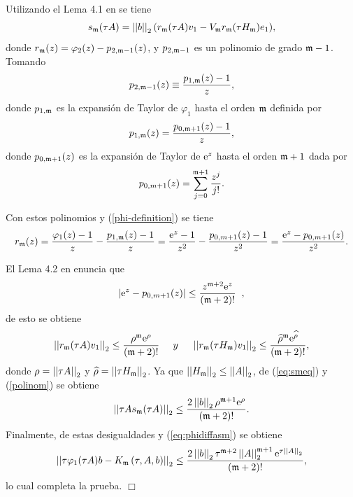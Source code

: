 Utilizando el Lema 4.1 en \cite{Saad92} se tiene
\begin{equation}
s_{\mathfrak{m}}(\tau A)=\left\lvert \left\lvert b \right\rvert \right\rvert_2 ( r_{\mathfrak{m}}(\tau A)v_1-V_{\mathfrak{m}} r_{\mathfrak{m}}(\tau H_{\mathfrak{m}})e_1) ,\label{eq:smeq}
\end{equation}
donde $r_{\mathfrak{m}}(z) = \varphi_{2}(z)-p_{2,\mathfrak{m}-1}(z)$, y $p_{2,\mathfrak{m}-1}$ es un polinomio de grado $\mathfrak{m}-1$. Tomando
\begin{equation*}
p_{2,\mathfrak{m}-1}(z)\equiv \frac{p_{1,\mathfrak{m}}(z)-1}{z},
\end{equation*}
donde $p_{1,\mathfrak{m}}$ es la expansión de Taylor de $\varphi_1$ hasta el orden  $\mathfrak{m}$
definida por
\[ p_{1,\mathfrak{m}}(z)= \frac{p_{0,\mathfrak{m}+1}(z)-1}{z}, \]
donde $p_{0,\mathfrak{m}+1}(z)$  es la expansión de Taylor de $\mathrm{e}^{z}$ hasta el orden $\mathfrak{m}+1$ dada por
\[ p_{0,m+1}(z)=\sum\limits^{\mathfrak{m}+1}_{j=0}\frac{z^j}{j!}. \]

Con estos polinomios y (\ref{phi-definition}) se tiene
\begin{equation*}
r_{\mathfrak{m}}(z) = \frac{\varphi_1(z)-1}{z}-\frac{p_{1,\mathfrak{m}}(z)-1}{z}=\frac{\mathrm{e}^{z}-1}{z^2}-\frac{p_{0,m+1}(z)-1}{z^2}
=\frac{\mathrm{e}^{z}-p_{0,m+1}(z)}{z^2}.
\end{equation*}

El Lema 4.2 en \cite{Saad92} enuncia que
\[ \left\lvert \mathrm{e}^{z}-p_{0,m+1}(z) \right\rvert \leq \frac{z^{\mathfrak{m}+2}\mathrm{e}^{z}}{(\mathfrak{m}+2)!}\;\;, \]
de esto se obtiene
\begin{equation}
\left\lvert \left\lvert r_{\mathfrak{m}}(\tau A)v_1 \right\rvert \right\rvert_2\leq \frac{\rho^{\mathfrak{m}}\mathrm{e}^{\rho}}{(\mathfrak{m}+2)!}\;\;\;\;\; y \;\;\;\;\; \left\lvert \left\lvert r_{\mathfrak{m}}(\tau H_{\mathfrak{m}})v_1 \right\rvert \right\rvert_2\leq \frac{\widehat{\rho}^{\mathfrak{m}}\mathrm{e}^{\widehat{\rho}}}{(\mathfrak{m}+2)!}, \label{polinom}
\end{equation}
donde $\rho=\left\lvert \left\lvert \tau A \right\rvert \right\rvert_2 $ y  $\widehat{\rho}=\left\lvert \left\lvert \tau H_{\mathfrak{m}} \right\rvert \right\rvert_2$. Ya que $\left\lvert \left\lvert H_{\mathfrak{m}} \right\rvert \right\rvert_2\leq\left\lvert \left\lvert A \right\rvert \right\rvert_2$, de (\ref{eq:smeq}) y (\ref{polinom}) se obtiene
\begin{equation*}
\left\lvert \left\lvert \tau As_{\mathfrak{m}}(\tau A) \right\rvert \right\rvert_2  \leq \frac{2 \left\lvert \left\lvert b \right\rvert \right\rvert_2\rho^{\mathfrak{m}+1}\mathrm{e}^{\rho}}{(\mathfrak{m}+2)!}.
\end{equation*}
Finalmente, de estas desigualdades y (\ref{eq:phidiffasm}) se obtiene
\begin{equation*}
\left\lvert \left\lvert \tau\varphi_1(\tau A)b - K_{\mathfrak{m}}\left(\tau,A , b \right) \right\rvert \right\rvert_2  \leq
\frac{2 \left\lvert \left\lvert b \right\rvert \right\rvert_2\tau^{\mathfrak{m}+2}\left\lvert \left\lvert A \right\rvert \right\rvert_2^{\mathfrak{m}+1}\mathrm{e}^{\tau \left\lvert \left\lvert A \right\rvert \right\rvert_2}}{(\mathfrak{m}+2)!},
\end{equation*}
lo cual completa la prueba. $\Box$

